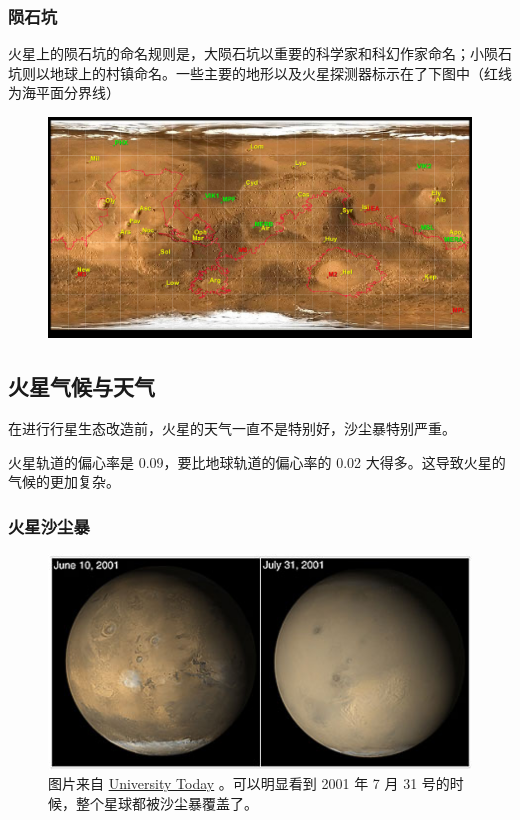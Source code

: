 \documentclass[letterpaper,10pt]{sphinxmanual}
\begin{document}
\subsubsection{陨石坑}
\label{mars:id11}
火星上的陨石坑的命名规则是，大陨石坑以重要的科学家和科幻作家命名；小陨石坑则以地球上的村镇命名。一些主要的地形以及火星探测器标示在了下图中（红线为海平面分界线）
\begin{figure}[htbp]
\centering

\includegraphics{Mars24_1.png}
\end{figure}


\subsection{火星气候与天气}
\label{mars:id12}
在进行行星生态改造前，火星的天气一直不是特别好，沙尘暴特别严重。

火星轨道的偏心率是 0.09，要比地球轨道的偏心率的 0.02 大得多。这导致火星的气候的更加复杂。


\subsubsection{火星沙尘暴}
\label{mars:id13}\begin{figure}[htbp]
\centering
\capstart

\includegraphics{duststorms.jpg}
\caption{图片来自 \href{http://www.universetoday.com/14892/mars-dust-storms}{University Today} 。可以明显看到 2001 年 7 月 31 号的时候，整个星球都被沙尘暴覆盖了。}\end{figure}
\begin{figure}[htbp]
\centering
\end{figure}
\end{document}
